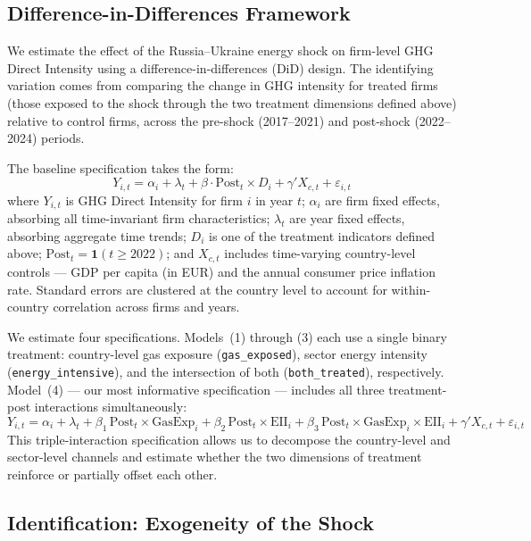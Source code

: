 \documentclass[authoryear,preprint,review,12pt]{elsarticle}
\begin{document}
\subsection{Difference-in-Differences Framework}

We estimate the effect of the Russia--Ukraine energy shock on firm-level GHG Direct Intensity using a difference-in-differences (DiD) design. The identifying variation comes from comparing the change in GHG intensity for treated firms (those exposed to the shock through the two treatment dimensions defined above) relative to control firms, across the pre-shock (2017--2021) and post-shock (2022--2024) periods.

The baseline specification takes the form:
\begin{equation}
Y_{i,t} = \alpha_i + \lambda_t + \beta \cdot \text{Post}_t \times D_i + \gamma' X_{c,t} + \varepsilon_{i,t}
\label{eq:did}
\end{equation}
where $Y_{i,t}$ is GHG Direct Intensity for firm $i$ in year $t$; $\alpha_i$ are firm fixed effects, absorbing all time-invariant firm characteristics; $\lambda_t$ are year fixed effects, absorbing aggregate time trends; $D_i$ is one of the treatment indicators defined above; $\text{Post}_t = \mathbf{1}(t \geq 2022)$; and $X_{c,t}$ includes time-varying country-level controls --- GDP per capita (in EUR) and the annual consumer price inflation rate. Standard errors are clustered at the country level to account for within-country correlation across firms and years.

We estimate four specifications. Models~(1) through (3) each use a single binary treatment: country-level gas exposure (\texttt{gas\_exposed}), sector energy intensity (\texttt{energy\_intensive}), and the intersection of both (\texttt{both\_treated}), respectively. Model~(4) --- our most informative specification --- includes all three treatment-post interactions simultaneously:
\begin{equation}
Y_{i,t} = \alpha_i + \lambda_t
  + \beta_1 \, \text{Post}_t \times \text{GasExp}_i
  + \beta_2 \, \text{Post}_t \times \text{EII}_i
  + \beta_3 \, \text{Post}_t \times \text{GasExp}_i \times \text{EII}_i
  + \gamma' X_{c,t} + \varepsilon_{i,t}
\label{eq:triple}
\end{equation}
This triple-interaction specification allows us to decompose the country-level and sector-level channels and estimate whether the two dimensions of treatment reinforce or partially offset each other.

\subsection{Identification: Exogeneity of the Shock}
\end{document}
